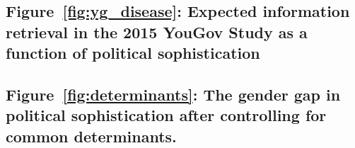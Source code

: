 \subsection{Figure~\ref{fig:yg_disease}: Expected information retrieval in the 2015 YouGov Study as a function of political sophistication}

\clearpage

\subsection{Figure~\ref{fig:determinants}: The gender gap in political sophistication after controlling for common determinants.}




